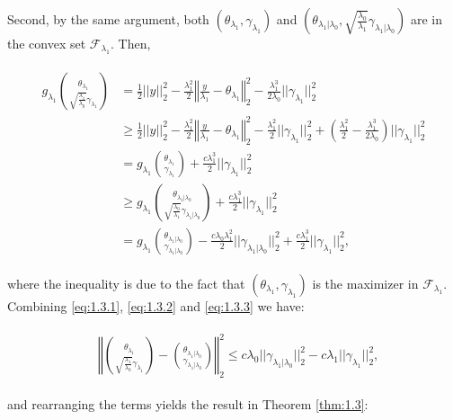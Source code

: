 Second, by the same argument, both $(\theta_{\lambda_1},\gamma_{\lambda_1})$ and $\left(\theta_{\lambda_1|\lambda_0},\sqrt{\frac{\lambda_0}{\lambda_1}}\gamma_{\lambda_1|\lambda_0}\right)$ are in the convex set $\mathcal{F}_{\lambda_1}$. Then,

\begin{gather}
    \label{eq:1.3.3}
    \begin{aligned}
        g_{\lambda_1}\binom{\theta_{\lambda_1}}{\sqrt{\frac{\lambda_1}{\lambda_0}}\gamma_{\lambda_1}}&=\frac{1}{2}||y||_2^2-\frac{\lambda_1^2}{2}\left\Vert\frac{y}{\lambda_1}-\theta_{\lambda_1}\right\Vert_2^2-\frac{\lambda_1^3}{2\lambda_0}||\gamma_{\lambda_1}||_2^2\\
        &\geq \frac{1}{2}||y||_2^2-\frac{\lambda_1^2}{2}\left\Vert\frac{y}{\lambda_1}-\theta_{\lambda_1}\right\Vert_2^2-\frac{\lambda_1^2}{2}||\gamma_{\lambda_1}||_2^2+\left(\frac{\lambda_1^2}{2}-\frac{\lambda_1^3}{2\lambda_0}\right)||\gamma_{\lambda_1}||_2^2\\
        &=g_{\lambda_1}\binom{\theta_{\lambda_1}}{\gamma_{\lambda_1}}+\frac{c\lambda_1^3}{2}||\gamma_{\lambda_1}||_2^2\\
        &\geq g_{\lambda_1}\binom{\theta_{\lambda_1|\lambda_0}}{\sqrt{\frac{\lambda_0}{\lambda_1}}\gamma_{\lambda_1|\lambda_0}}+\frac{c\lambda_1^3}{2}||\gamma_{\lambda_1}||_2^2\\
        &=g_{\lambda_1}\binom{\theta_{\lambda_1|\lambda_0}}{\gamma_{\lambda_1|\lambda_0}}-\frac{c\lambda_0\lambda_1^2}{2}||\gamma_{\lambda_1|\lambda_0}||_2^2+\frac{c\lambda_1^3}{2}||\gamma_{\lambda_1}||_2^2,
    \end{aligned}
\end{gather}

where the inequality is due to the fact that $(\theta_{\lambda_1},\gamma_{\lambda_1})$ is the maximizer in $\mathcal{F}_{\lambda_1}$. Combining \eqref{eq:1.3.1}, \eqref{eq:1.3.2} and \eqref{eq:1.3.3} we have:

\begin{gather}
    \begin{aligned}
        &\left\Vert\binom{\theta_{\lambda_1}}{\sqrt{\frac{\lambda_1}{\lambda_0}}\gamma_{\lambda_1}}-\binom{\theta_{\lambda_1|\lambda_0}}{\gamma_{\lambda_1|\lambda_0}}\right\Vert_2^2\leq c\lambda_0||\gamma_{\lambda_1|\lambda_0}||_2^2-c\lambda_1||\gamma_{\lambda_1}||_2^2,
    \end{aligned}
\end{gather}

and rearranging the terms yields the result in Theorem \ref{thm:1.3}:

